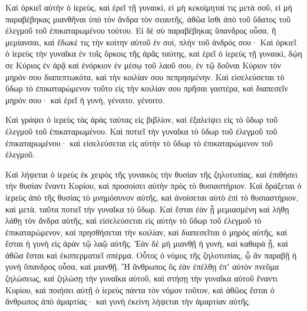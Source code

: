 {Καὶ ὁρκιεῖ αὐτὴν ὁ ἱερεὺς, καὶ ἐρεῖ τῇ γυναικὶ, εἰ μὴ κεκοίμηταί τις μετὰ σοῦ, εἰ μὴ παραβέβηκας μιανθῆναι ὑπὸ τὸν ἄνδρα τὸν σεαυτῆς, ἀθῶα ἴσθι ἀπὸ τοῦ ὕδατος τοῦ ἐλεγμοῦ τοῦ ἐπικαταρωμένου τούτου.
Εἰ δὲ σὺ παραβέβηκας ὕπανδρος οὖσα, ἢ μεμίανσαι, καὶ ἔδωκέ τις τὴν κοίτην αὐτοῦ ἐν σοὶ, πλὴν τοῦ ἀνδρός σου·
Καὶ ὁρκιεῖ ὁ ἱερεὺς τὴν γυναῖκα ἐν τοῖς ὅρκοις τῆς ἀρᾶς ταύτης, καὶ ἐρεῖ ὁ ἱερεὺς τῇ γυναικὶ, δῴη σε Κύριος ἐν ἀρᾷ καὶ ἐνόρκιον ἐν μέσῳ τοῦ λαοῦ σου, ἐν τῷ δοῦναι Κύριον τὸν μηρόν σου διαπεπτωκότα, καὶ τὴν κοιλίαν σου πεπρησμένην.
Καὶ εἰσελεύσεται τὸ ὕδωρ τὸ ἐπικαταρώμενον τοῦτο εἰς τὴν κοιλίαν σου πρῆσαι γαστέρα, καὶ διαπεσεῖν μηρόν σου· καὶ ἐρεῖ ἡ γυνὴ, γένοιτο, γένοιτο.
\par }{\PP {}Καὶ γράψει ὁ ἱερεὺς τὰς ἀρὰς ταύτας εἰς βιβλίον, καὶ ἐξαλείψει εἰς τὸ ὕδωρ τοῦ ἐλεγμοῦ τοῦ ἐπικαταρωμένου.
Καὶ ποτιεῖ τὴν γυναῖκα τὸ ὕδωρ τοῦ ἐλεγμοῦ τοῦ ἐπικαταρωμένου· καὶ εἰσελεύσεται εἰς αὐτὴν τὸ ὕδωρ τὸ ἐπικαταρώμενον τοῦ ἐλεγμοῦ.
\par }{\PP {}Καὶ λήψεται ὁ ἱερεὺς ἐκ χειρὸς τῆς γυναικὸς τὴν θυσίαν τῆς ζηλοτυπίας, καὶ ἐπιθήσει τὴν θυσίαν ἔναντι Κυρίου, καὶ προσοίσει αὐτὴν πρὸς τὸ θυσιαστήριον.
Καὶ δράξεται ὁ ἱερεὺς ἀπὸ τῆς θυσίας τὸ μνημόσυνον αὐτῆς, καὶ ἀνοίσεται αὐτὸ ἐπὶ τὸ θυσιαστήριον, καὶ μετὰ. ταῦτα ποτιεῖ τὴν γυναῖκα τὸ ὕδωρ.
Καὶ ἔσται ἐὰν ᾖ μεμιασμένη καὶ λήθῃ λάθῃ τὸν ἄνδρα αὐτῆς, καὶ εἰσελεύσεται εἰς αὐτὴν τὸ ὕδωρ τοῦ ἐλεγμοῦ τὸ ἐπικαταρώμενον, καὶ πρησθήσεται τὴν κοιλίαν, καὶ διαπεσεῖται ὁ μηρὸς αὐτῆς, καὶ ἔσται ἡ γυνὴ εἰς ἀρὰν τῷ λαῷ αὐτῆς.
Ἐὰν δὲ μὴ μιανθῇ ἡ γυνὴ, καὶ καθαρὰ ᾖ, καὶ ἀθῶα ἔσται καὶ ἐκσπερματιεῖ σπέρμα.
Οὗτος ὁ νόμος τῆς ζηλοτυπίας, ᾧ ἂν παραβῇ ἡ γυνὴ ὕπανδρος οὖσα, καὶ μιανθῇ.
Ἢ ἄνθρωπος ὃς ἐὰν ἐπέλθῃ ἐπʼ αὐτὸν πνεῦμα ζηλώσεως, καὶ ζηλώσῃ τὴν γυναῖκα αὐτοῦ, καὶ στήσῃ τὴν γυναῖκα αὐτοῦ ἔναντι Κυρίου, καὶ ποιήσει αὐτῇ ὁ ἱερεὺς πάντα τὸν νόμον τοῦτον,
καὶ ἀθῶος ἔσται ὁ ἄνθρωπος ἀπὸ ἁμαρτίας· καὶ γυνὴ ἐκείνη λήψεται τὴν ἁμαρτίαν αὐτῆς.

}
